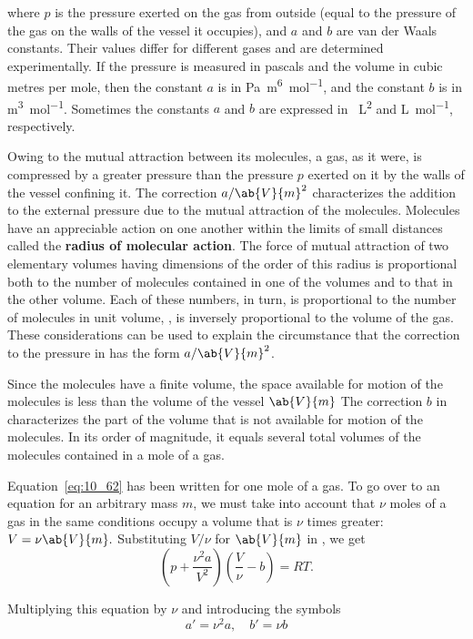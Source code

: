 \noindent
where $p$ is the pressure exerted on the gas from outside (equal to the pressure of the gas on the walls of the vessel it occupies), and $a$ and $b$ are van der Waals constants. Their values differ for different gases and are determined experimentally. If the pressure is measured in pascals and the volume in cubic metres per mole, then the constant $a$ is in \si{\pascal~\metre^6~\mole^{-1}}, and the constant $b$ is in \si{\metre\cubed\per\mole}. Sometimes the constants $a$ and $b$ are expressed in \si{\atm\liter\squared} and \si{\liter\per\mole}, respectively.

Owing to the mutual attraction between its molecules, a gas, as it were, is compressed by a greater pressure than the pressure $p$ exerted on it by the walls of the vessel confining it. The correction $a/\ab{V}{m}^2$ characterizes the addition to the external pressure due to the mutual attraction of the molecules. Molecules have an appreciable action on one another within the limits of small distances called the \textbf{radius of molecular action}. The force of mutual attraction of two elementary volumes having dimensions of the order of this radius is proportional both to the number of molecules contained in one of the volumes and to that in the other volume. Each of these numbers, in turn, is proportional to the number of molecules in unit volume, \ie, is inversely proportional to the volume of the gas. These considerations can be used to explain the circumstance that the correction to the pressure in  has the form $a/\ab{V}{m}^2$.

Since the molecules have a finite volume, the space available for motion of the molecules is less than the volume of the vessel $\ab{V}{m}$ The correction $b$ in  characterizes the part of the volume that is not available for motion of the molecules. In its order of magnitude, it equals several total volumes of the molecules contained in a mole of a gas.

Equation~\eqref{eq:10_62} has been written for one mole of a gas. To go over to an equation for an arbitrary mass $m$, we must take into account that $\nu$ moles of a gas in the same conditions occupy a volume that is $\nu$ times greater: $V=\nu\ab{V}{m}.$ Substituting $V/\nu$ for $\ab{V}{m}$ in , we get
\begin{equation*}
	\left(p + \frac{\nu^2 a}{V^2}\right) \left(\frac{V}{\nu} - b\right) = RT.
\end{equation*}

\noindent
Multiplying this equation by $\nu$ and introducing the symbols
\begin{equation}\label{eq:10_63}
	a' = \nu^2 a,\quad b' = \nu b
\end{equation}

